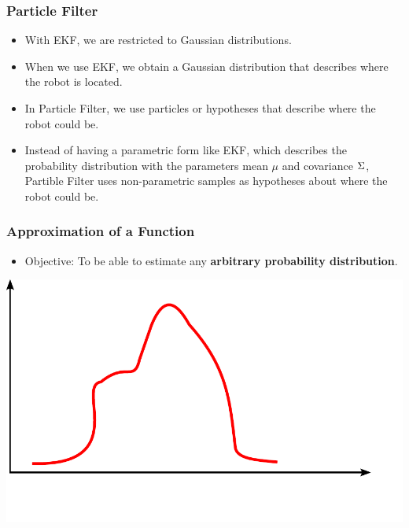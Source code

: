 \begin{frame}
    \frametitle{Particle Filter}
    \footnotesize
    \begin{itemize}
    \item With EKF, we are restricted to Gaussian distributions.
    \item When we use EKF, we obtain a Gaussian distribution that describes where the robot is located.
    \item In Particle Filter, we use particles or hypotheses that describe where the robot could be.
    \item Instead of having a parametric form like EKF, which describes the probability distribution with the parameters mean $\mu$ and covariance $\Sigma$, Partible Filter uses non-parametric samples as hypotheses about where the robot could be.
    
    \end{itemize}
    
    \begin{center}
    \end{center}
    
    
    \end{frame}
    
    \begin{frame}
    \frametitle{Approximation of a Function}
    \footnotesize
    
    \begin{itemize}
    \item Objective: To be able to estimate any \textbf{arbitrary probability distribution}.
    \end{itemize}
    
    \begin{center}
    \includegraphics[width=0.5\columnwidth]{./images/particle_filter/arbitrary_distribution.pdf}
    \end{center}
    
    \end{frame}
    
